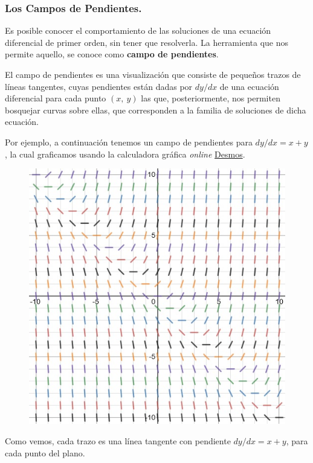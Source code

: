 \documentclass[12pt]{article}
\begin{document}
\subsubsection{Los Campos de Pendientes.}

Es posible conocer el comportamiento de las soluciones de una ecuación diferencial de primer orden, sin tener que resolverla. La herramienta que nos permite aquello, se conoce como \textbf{campo de pendientes}.

El campo de pendientes es una visualización que consiste de pequeños trazos de líneas tangentes, cuyas pendientes están dadas por $dy/dx$ de una ecuación diferencial para cada punto $(x, \ y)$ las que, posteriormente, nos permiten bosquejar curvas sobre ellas, que corresponden a la familia de soluciones de dicha ecuación.

Por ejemplo, a continuación tenemos un campo de pendientes para $dy/dx = x + y$, la cual graficamos usando la calculadora gráfica \textit{online} \href{https://www.desmos.com/calculator/zmpjqh7wl3}{Desmos}.

\begin{figure}[hbt!]
\centering
\includegraphics[scale=0.5]{img/slope-field.jpg}
\end{figure}

Como vemos, cada trazo es una línea tangente con pendiente $dy/dx = x + y$, para cada punto del plano.
\end{document}
